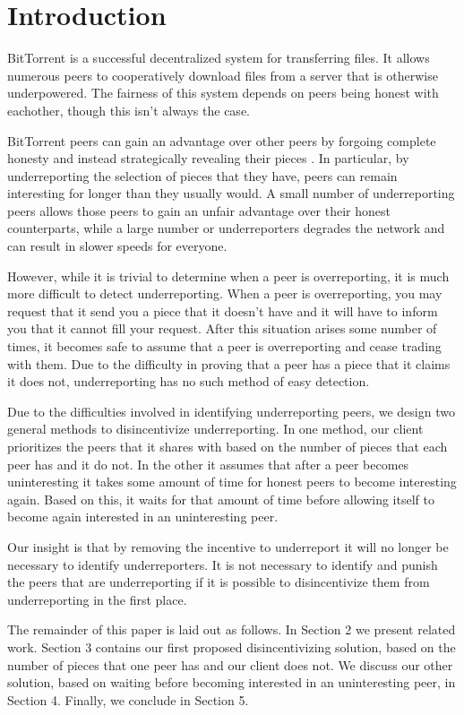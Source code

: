\section{Introduction}

BitTorrent is a successful decentralized system for transferring files. It allows numerous peers to cooperatively download files from a server that is otherwise underpowered. The fairness of this system depends on peers being honest with eachother, though this isn't always the case.

BitTorrent peers can gain an advantage over other peers by forgoing complete honesty and instead strategically revealing their pieces \cite{dlbittorrent}. In particular, by underreporting the selection of pieces that they have, peers can remain interesting for longer than they usually would. A small number of underreporting peers allows those peers to gain an unfair advantage over their honest counterparts, while a large number or underreporters degrades the network and can result in slower speeds for everyone.

However, while it is trivial to determine when a peer is overreporting, it is much more difficult to detect underreporting. When a peer is overreporting, you may request that it send you a piece that it doesn't have and it will have to inform you that it cannot fill your request. After this situation arises some number of times, it becomes safe to assume that a peer is overreporting and cease trading with them. Due to the difficulty in proving that a peer has a piece that it claims it does not, underreporting has no such method of easy detection.

Due to the difficulties involved in identifying underreporting peers, we design two general methods to disincentivize underreporting. In one method, our client prioritizes the peers that it shares with based on the number of pieces that each peer has and it do not. In the other it assumes that after a peer becomes uninteresting it takes some amount of time for honest peers to become interesting again. Based on this, it waits for that amount of time before allowing itself to become again interested in an uninteresting peer.

Our insight is that by removing the incentive to underreport it will no longer be necessary to identify underreporters. It is not necessary to identify and punish the peers that are underreporting if it is possible to disincentivize them from underreporting in the first place.

The remainder of this paper is laid out as follows. In Section 2 we present related work. Section 3 contains our first proposed disincentivizing solution, based on the number of pieces that one peer has and our client does not. We discuss our other solution, based on waiting before becoming interested in an uninteresting peer, in Section 4. Finally, we conclude in Section 5.

